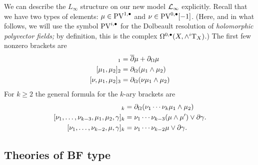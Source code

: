 We can describe the $L_\infty$ structure on our new model $\mathcal L_\infty$ explicitly.
Recall that we have two types of elements: $\mu \in {\rm PV}^{1,\bullet}$ and $\nu \in {\rm PV}^{0,\bullet}[-1]$. (Here, and in what follows, we will use the symbol ${\rm PV}^{i,\bullet}$ for the Dolbeault resolution of \emph{holomorphic polyvector fields;} by definition, this is the complex $\Omega^{0,\bullet}(X,\wedge^i {\rm T}_X)$.)
The first few nonzero brackets are
\begin{align*}
[\mu]_1 & = \dbar \mu + \div \mu \\
[\mu_1,\mu_2]_2 & = \div (\mu_1 \wedge \mu_2) \\
[\nu, \mu_1,\mu_2]_3 & = \div(\nu \mu_1 \wedge \mu_2) 
\end{align*}
For $k \geq 2$ the general formula for the $k$-ary brackets are 
\begin{align*}
[\nu_1, \ldots, \nu_{k-2}, \mu_1,\mu_2]_{k} & = \div(\nu_1 \cdots \nu_k \mu_1 \wedge \mu_2) \\
[\nu_1,\ldots, \nu_{k-3}, \mu_1,\mu_2,\gamma]_k & = \nu_1 \cdots \nu_{k-3} (\mu \wedge \mu') \vee \del \gamma .\\
[\nu_1,\ldots,\nu_{k-2}, \mu, \gamma]_k & = \nu_1 \cdots \nu_{k-2} \mu \vee \del \gamma .
\end{align*}





\subsection{Theories of BF type}

